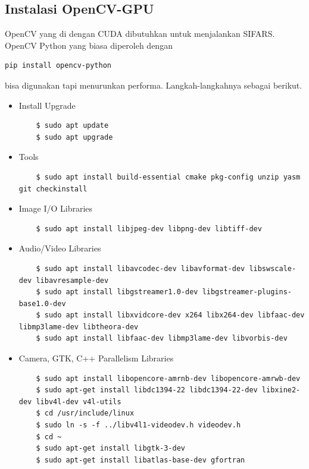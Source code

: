 \subsection{Instalasi OpenCV-GPU}
OpenCV yang di dengan  CUDA dibutuhkan untuk menjalankan SIFARS.
OpenCV Python yang biasa diperoleh dengan 
\begin{lstlisting}
pip install opencv-python 
\end{lstlisting} bisa digunakan tapi menurunkan performa. Langkah-langkahnya sebagai berikut.

\begin{itemize}
  \item Install Upgrade
  
  \begin{lstlisting}
    $ sudo apt update
    $ sudo apt upgrade
  \end{lstlisting}

  \item Tools
  
  \begin{lstlisting}
    $ sudo apt install build-essential cmake pkg-config unzip yasm git checkinstall
  \end{lstlisting}
  
  \item Image I/O Libraries
  
  \begin{lstlisting}
    $ sudo apt install libjpeg-dev libpng-dev libtiff-dev
  \end{lstlisting}

  \item Audio/Video Libraries
  
  \begin{lstlisting}
    $ sudo apt install libavcodec-dev libavformat-dev libswscale-dev libavresample-dev
    $ sudo apt install libgstreamer1.0-dev libgstreamer-plugins-base1.0-dev
    $ sudo apt install libxvidcore-dev x264 libx264-dev libfaac-dev libmp3lame-dev libtheora-dev 
    $ sudo apt install libfaac-dev libmp3lame-dev libvorbis-dev
  \end{lstlisting}

  \item Camera, GTK, C++ Parallelism Libraries
  
  \begin{lstlisting}
    $ sudo apt install libopencore-amrnb-dev libopencore-amrwb-dev
    $ sudo apt-get install libdc1394-22 libdc1394-22-dev libxine2-dev libv4l-dev v4l-utils
    $ cd /usr/include/linux
    $ sudo ln -s -f ../libv4l1-videodev.h videodev.h
    $ cd ~
    $ sudo apt-get install libgtk-3-dev
    $ sudo apt-get install libatlas-base-dev gfortran
  \end{lstlisting}


\end{itemize}

